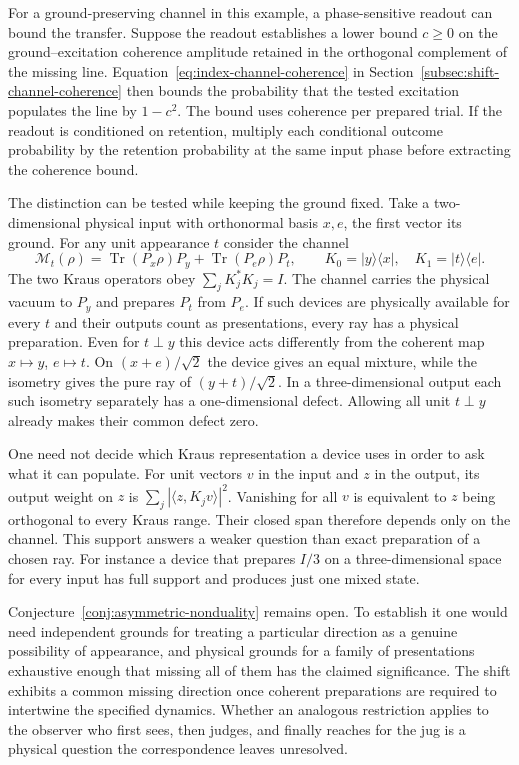 \documentclass[11pt]{article}
\theoremstyle{definition}
\DeclareMathOperator{\Tr}{Tr}
\newcommand{\ket}[1]{\lvert #1\rangle}
\newcommand{\bra}[1]{\langle #1\rvert}
\begin{document}
For a ground-preserving channel in this example, a phase-sensitive readout can bound the transfer. Suppose the readout establishes a lower bound $c\ge0$ on the ground--excitation coherence amplitude retained in the orthogonal complement of the missing line. Equation~\eqref{eq:index-channel-coherence} in Section~\ref{subsec:shift-channel-coherence} then bounds the probability that the tested excitation populates the line by $1-c^2$. The bound uses coherence per prepared trial. If the readout is conditioned on retention, multiply each conditional outcome probability by the retention probability at the same input phase before extracting the coherence bound.

The distinction can be tested while keeping the ground fixed. Take a two-dimensional physical input with orthonormal basis $x,e$, the first vector its ground. For any unit appearance $t$ consider the channel
\begin{equation}
 \mathcal M_t(\rho)=\Tr(P_x\rho)P_y+\Tr(P_e\rho)P_t,\qquad
 K_0=\ket y\!\bra x,\quad K_1=\ket t\!\bra e .
 \label{eq:ground-compatible-preparation-channel}
\end{equation}
The two Kraus operators obey $\sum_jK_j^*K_j=I$. The channel carries the physical vacuum to $P_y$ and prepares $P_t$ from $P_e$. If such devices are physically available for every $t$ and their outputs count as presentations, every ray has a physical preparation. Even for $t\perp y$ this device acts differently from the coherent map $x\mapsto y$, $e\mapsto t$. On $(x+e)/\sqrt2$ the device gives an equal mixture, while the isometry gives the pure ray of $(y+t)/\sqrt2$. In a three-dimensional output each such isometry separately has a one-dimensional defect. Allowing all unit $t\perp y$ already makes their common defect zero.

One need not decide which Kraus representation a device uses in order to ask what it can populate. For unit vectors $v$ in the input and $z$ in the output, its output weight on $z$ is $\sum_j|\langle z,K_jv\rangle|^2$. Vanishing for all $v$ is equivalent to $z$ being orthogonal to every Kraus range. Their closed span therefore depends only on the channel. This support answers a weaker question than exact preparation of a chosen ray. For instance a device that prepares $I/3$ on a three-dimensional space for every input has full support and produces just one mixed state.

Conjecture~\ref{conj:asymmetric-nonduality} remains open. To establish it one would need independent grounds for treating a particular direction as a genuine possibility of appearance, and physical grounds for a family of presentations exhaustive enough that missing all of them has the claimed significance. The shift exhibits a common missing direction once coherent preparations are required to intertwine the specified dynamics. Whether an analogous restriction applies to the observer who first sees, then judges, and finally reaches for the jug is a physical question the correspondence leaves unresolved.
\end{document}
